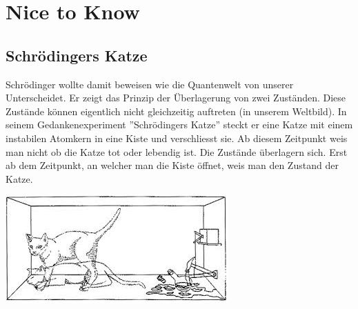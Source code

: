 \chapter{Nice to Know}
\section{Schrödingers Katze}
Schrödinger wollte damit beweisen wie die Quantenwelt von unserer Unterscheidet. Er zeigt das Prinzip der Überlagerung von zwei Zuständen. Diese Zustände können eigentlich nicht gleichzeitig auftreten (in unserem Weltbild). In seinem Gedankenexperiment ''Schrödingers Katze'' steckt er eine Katze mit einem instabilen Atomkern in eine Kiste und verschliesst sie. Ab diesem Zeitpunkt weis man nicht ob die Katze tot oder lebendig ist. Die Zustände überlagern sich. Erst ab dem Zeitpunkt, an welcher man die Kiste öffnet, weis man den Zustand der Katze.\\
\begin{center}
   	\includegraphics[scale = 0.4]{images/schroedingers_katze.jpg}
\end{center}